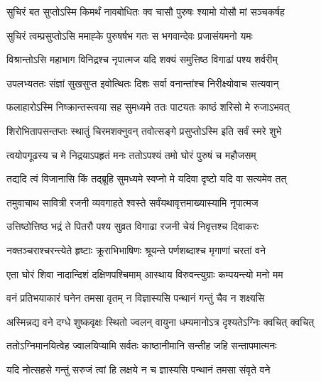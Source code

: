 \begin{center}
\twolineshloka
{सुचिरं बत सुप्तोऽस्मि किमर्थं नावबोधितः}
{क्व चासौ पुरुषः श्यामो योसौ मां सञ्चकर्षह}




\twolineshloka
{सुचिरं त्वम्प्रसुप्तोऽसि ममाह्के पुरुषर्षभ}
{गतः स भगवान्देवः प्रजासंयमनो यमः}


\twolineshloka
{विश्रान्तोऽसि महाभाग विनिद्रश्च नृपात्मज}
{यदि शक्यं समुत्तिष्ठ विगाढां पश्य शर्वरीम्}




\twolineshloka
{उपलभ्यततः संज्ञां सुखसुप्त इवोत्थितः}
{दिशः सर्वा वनान्तांश्च निरीक्ष्योवाच सत्यवान्}


\twolineshloka
{फलाहारोऽस्मि निष्क्रान्तस्त्वया सह सुमध्यमे}
{ततः पाटयतः काष्ठं शरिसो मे रुजाऽभवत्}


\twolineshloka
{शिरोभितापसन्तप्तः स्थातुं चिरमशक्नुवन्}
{तवोत्सङ्गे प्रसुप्तोऽस्मि इति सर्वं स्मरे शुभे}


\twolineshloka
{त्वयोपगूढस्य च मे निद्रयाऽपहृतं मनः}
{ततोऽपश्यं तमो घोरं पुरुषं च महौजसम्}


\twolineshloka
{तद्यदि त्वं विजानासि किं तद्ब्रूहि सुमध्यमे}
{स्वप्नो मे यदिवा दृष्टो यदि वा सत्यमेव तत्}


\twolineshloka
{तमुवाचाथ सावित्री रजनी व्यवगाहते}
{श्वस्ते सर्वंयथावृत्तमाख्यास्यामि नृपात्मज}


\twolineshloka
{उत्तिष्ठोत्तिष्ठ भद्रं ते पितरौ पश्य सुव्रत}
{विगाढा रजनी चेयं निवृत्तश्च दिवाकरः}


\twolineshloka
{नक्तञ्चराश्चरन्त्येते हृष्टाः क्रूराभिभाषिणः}
{श्रूयन्ते पर्णशब्दाश्च मृगाणां चरतां वने}


\twolineshloka
{एता घोरं शिवा नादान्दिशं दक्षिणपश्चिमाम्}
{आस्थाय विरुवन्त्युग्राः कम्पयन्त्यो मनो मम}




\twolineshloka
{वनं प्रतिभयाकारं घनेन तमसा वृतम्}
{न विज्ञास्यसि पन्थानं गन्तुं चैव न शक्ष्यसि}




\twolineshloka
{अस्मिन्नद्य वने दग्धे शुष्कवृक्षः स्थितो ज्वलन्}
{वायुना धम्यमानोऽत्र दृश्यतेऽग्निः क्वचित् क्वचित्}


\twolineshloka
{ततोऽग्निमानयित्वेह ज्वालयिप्यामि सर्वतः}
{काष्ठानीमानि सन्तीह जहि सन्तापमात्मनः}


\twolineshloka
{यदि नोत्सहसे गन्तुं सरुजं त्वां हि लक्षये}
{न च ज्ञास्यसि पन्थानं तमसा संवृते वने}



\end{center}

